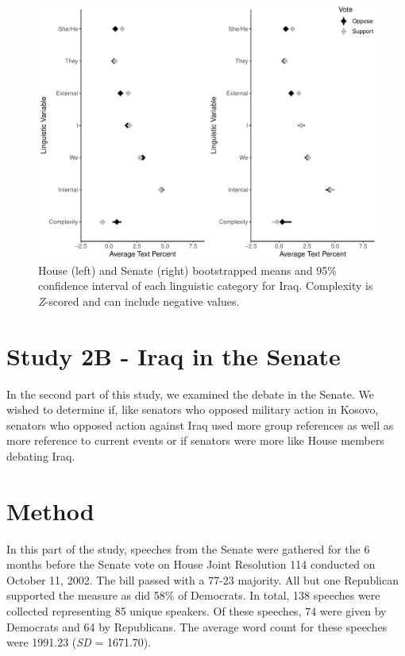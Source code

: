 \documentclass[english,,man]{apa6}
\begin{document}
\begin{figure}
\centering
\includegraphics{Language-of-War-Markdown_KJ2_files/figure-latex/Ipic-1.pdf}
\caption{\label{fig:Ipic}House (left) and Senate (right) bootstrapped means and 95\% confidence interval of each linguistic category for Iraq. Complexity is \emph{Z}-scored and can include negative values.}
\end{figure}

\hypertarget{study-2b---iraq-in-the-senate}{%
\section{Study 2B - Iraq in the Senate}\label{study-2b---iraq-in-the-senate}}

In the second part of this study, we examined the debate in the Senate. We wished to determine if, like senators who opposed military action in Kosovo, senators who opposed action against Iraq used more group references as well as more reference to current events or if senators were more like House members debating Iraq.

\hypertarget{method-3}{%
\section{Method}\label{method-3}}

In this part of the study, speeches from the Senate were gathered for the 6 months before the Senate vote on House Joint Resolution 114 conducted on October 11, 2002. The bill passed with a 77-23 majority. All but one Republican supported the measure as did 58\% of Democrats. In total, 138 speeches were collected representing 85 unique speakers. Of these speeches, 74 were given by Democrats and 64 by Republicans. The average word count for these speeches were 1991.23 (\emph{SD} = 1671.70).
\end{document}
